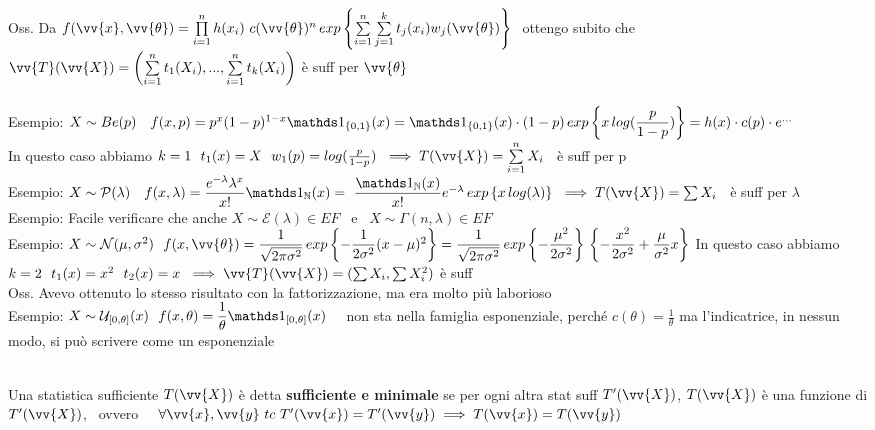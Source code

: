 Oss. Da $f(\vv{x},\vv{\theta})= \Prod{i=1}{n}h(x_i)\ c(\vv{\theta})^n \,exp \OOO \Sum{i=1}{n} \Sum{j=1}{k} t_j(x_i)w_j(\vv{\theta})\CCC\ $ ottengo subito che\\ $\vv{T}( \vv{X})=\O \Sum{i=1}{n}t_1(X_i), ..., \Sum{i=1}{n}t_k(X_i)\C$ è suff per $\vv{\theta}$ \\ \\


Esempio: $X\sim Be(p) \ \ \ f(x,p)=p^x(1-p)^{1-x}\II_{\{0,1\}}(x) = \II_{\{0,1\}}(x)\cdot(1-p)\, exp\OOO x \, log(\frac{p}{1-p}) \CCC = h(x)\cdot c(p) \cdot e^{...}$\\
In questo caso abbiamo $k=1 \ \ t_1(x)=X \ \ w_1(p)=log(\tfrac{p}{1-p}) \ \implies T(\vv{X})=\Sum{i=1}{n}X_i$ \ è suff per p\\ 

Esempio: $X\sim \Pc(\lambda) \ \ \ f(x,\lambda)=\frac{e^{-\lambda}\lambda^x}{x!}\II_{\NN}(x)= \ \frac{\II_{\NN}(x)}{x!}e^{-\lambda}\, exp\OOO x \, log(\lambda) \CCC \ \implies T(\vv{X})=\sum X_i$ \ è suff per $\lambda$\\

Esempio: Facile verificare che anche $X\sim \mathcal{E}(\lambda) \in EF$ \ e \ $X\sim \Gamma (n,\lambda)\in EF$\\

Esempio: $X\sim \Nc(\mu,\sigma^2) \ \ f(x,\vv{\theta})=\frac{1}{\sqrt{2\pi\sigma^2}} \, exp \OOO -\frac{1}{2\sigma^2}(x-\mu)^2\CCC = \frac{1}{\sqrt{2\pi\sigma^2}}\, exp\OOO -\frac{\mu^2}{2\sigma^2}\CCC \, \OOO -\frac{x^2}{2\sigma^2} +\frac{\mu}{\sigma^2}x \CCC$
In questo caso abbiamo $k=2 \ \ t_1(x)=x^2 \ \ t_2(x)=x \ 
\implies \vv{T}(\vv{X})=(\sum X_i, \sum X_i^2)$ è suff\\
Oss. Avevo ottenuto lo stesso risultato con la fattorizzazione, ma era molto più laborioso\\ 

Esempio: $X\sim \Uc_{[0,\theta]}(x) \ \ f(x,\theta)=\frac{1}{\theta}\II_{[0,\theta]}(x)$ \ \ non sta nella famiglia esponenziale, perché $c(\theta)=\frac{1}{\theta}$ ma l'indicatrice, in nessun modo, si può scrivere come un esponenziale  \\ \\

\begin{defi}
    Una statistica sufficiente $T(\vv{X})$ è detta \textbf{sufficiente e minimale} se per ogni altra stat suff $T'(\vv{X})$,  $T(\vv{X})$ è una funzione di $T'(\vv{X})$, \ ovvero \ \ $\forall \vv{x},\vv{y} \ tc \ T'(\vv{x})=T'(\vv{y}) \implies T(\vv{x})=T(\vv{y})$
\end{defi}

